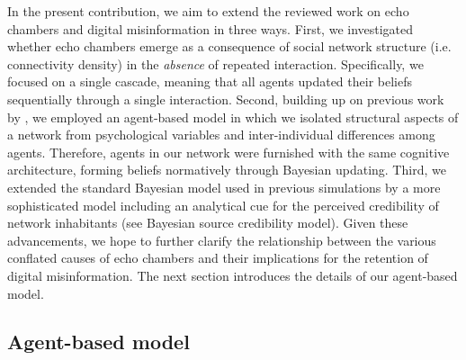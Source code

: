 \documentclass[doc,floatsintext]{apa6}
\begin{document}
In the present contribution, we aim to extend the reviewed work on echo chambers and digital misinformation in three ways. First, we investigated whether echo chambers emerge as a consequence of social network structure (i.e. connectivity density) in the \emph{absence} of repeated interaction. Specifically, we focused on a single cascade, meaning that all agents updated their beliefs sequentially through a single interaction. Second, building up on previous work by \citep{madsen2017growing, madsen2018large}, we employed an agent-based model in which we isolated structural aspects of a network from psychological variables and inter-individual differences among agents. Therefore, agents in our network were furnished with the same cognitive architecture, forming beliefs normatively through Bayesian updating. Third, we extended the standard Bayesian model used in previous simulations by a more sophisticated model including an analytical cue for the perceived credibility of network inhabitants (see Bayesian source credibility model). Given these advancements, we hope to further clarify the relationship between the various conflated causes of echo chambers and their implications for the retention of digital misinformation. The next section introduces the details of our agent-based model.


\subsection{Agent-based model}
\end{document}
